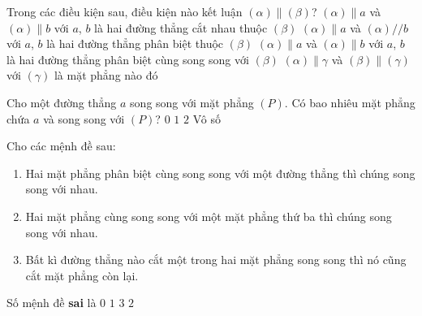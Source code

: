 \begin{ex}%
	Trong các điều kiện sau, điều  kiện nào kết luận $\left(\alpha\right)\parallel\left(\beta\right)$?
	 \choice
		 {\True $\left(\alpha\right)\parallel a$ và $\left(\alpha\right)\parallel b$ với $ a$, $b$ là hai đường thẳng cắt nhau thuộc $\left(\beta\right)$}
		{$\left(\alpha\right)\parallel  a$ và $\left(\alpha\right)//b$ với $ a$, $b$ là hai đường thẳng phân biệt thuộc $\left(\beta\right)$}
		{$\left(\alpha\right)\parallel a$ và $\left(\alpha\right)\parallel b$ với $ a$, $b$ là hai đường thẳng phân biệt cùng song song với $\left(\beta\right)$} 
		{$\left(\alpha\right)\parallel\gamma $ và $\left(\beta\right)\parallel\left(\gamma\right)$  với $\left(\gamma\right)$ là mặt phẳng nào đó}
\end{ex}

\begin{ex}%
	Cho một đường thẳng $a$ song song  với mặt phẳng $(P)$. Có bao nhiêu mặt phẳng chứa $a$ và song song với $(P)$?
	\choice 
		 {$0$}
		{\True  $1$}
		{$2$} 
		 {Vô số}
\end{ex}

\begin{ex}%
	Cho  các mệnh đề sau:
	\begin{enumerate}[1)]
		\item Hai mặt phẳng phân biệt cùng song song với một đường thẳng thì chúng song song  với nhau.
		\item Hai mặt phẳng cùng song song với một mặt phẳng thứ  ba thì chúng song song với nhau.
		\item Bất kì đường thẳng nào cắt một trong hai mặt phẳng song song thì  nó cũng cắt mặt phẳng còn lại.
	\end{enumerate}
	Số mệnh  đề \textbf{sai} là
	\choice 
		 {$0$}
		 {$1$}
		 {$3$}
		 {\True $2$}
\end{ex}

